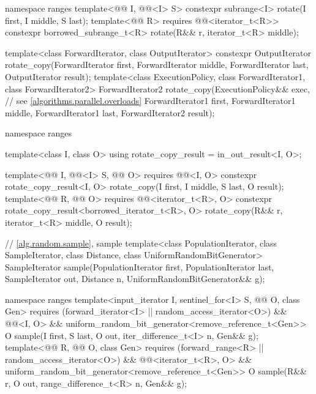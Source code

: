 \begin{codeblock}
{  namespace ranges {
    template<@@ I, @@<I> S>
      constexpr subrange<I> rotate(I first, I middle, S last);
    template<@@ R>
      requires @@<iterator_t<R>>
      constexpr borrowed_subrange_t<R> rotate(R&& r, iterator_t<R> middle);
  }

  template<class ForwardIterator, class OutputIterator>
    constexpr OutputIterator
      rotate_copy(ForwardIterator first, ForwardIterator middle,
                  ForwardIterator last, OutputIterator result);
  template<class ExecutionPolicy, class ForwardIterator1, class ForwardIterator2>
    ForwardIterator2
      rotate_copy(ExecutionPolicy&& exec,                       // see \ref{algorithms.parallel.overloads}
                  ForwardIterator1 first, ForwardIterator1 middle,
                  ForwardIterator1 last, ForwardIterator2 result);

  namespace ranges {
    template<class I, class O>
      using rotate_copy_result = in_out_result<I, O>;

    template<@@ I, @@<I> S, @@ O>
      requires @@<I, O>
      constexpr rotate_copy_result<I, O>
        rotate_copy(I first, I middle, S last, O result);
    template<@@ R, @@ O>
      requires @@<iterator_t<R>, O>
      constexpr rotate_copy_result<borrowed_iterator_t<R>, O>
        rotate_copy(R&& r, iterator_t<R> middle, O result);
  }

  // \ref{alg.random.sample}, sample
  template<class PopulationIterator, class SampleIterator,
           class Distance, class UniformRandomBitGenerator>
    SampleIterator sample(PopulationIterator first, PopulationIterator last,
                          SampleIterator out, Distance n,
                          UniformRandomBitGenerator&& g);

  namespace ranges {
    template<input_iterator I, sentinel_for<I> S,
             @@ O, class Gen>
      requires (forward_iterator<I> || random_access_iterator<O>) &&
               @@<I, O> &&
               uniform_random_bit_generator<remove_reference_t<Gen>>
      O sample(I first, S last, O out, iter_difference_t<I> n, Gen&& g);
    template<@@ R, @@ O, class Gen>
      requires (forward_range<R> || random_access_iterator<O>) &&
               @@<iterator_t<R>, O> &&
               uniform_random_bit_generator<remove_reference_t<Gen>>
      O sample(R&& r, O out, range_difference_t<R> n, Gen&& g);
  }

}
\end{codeblock}
